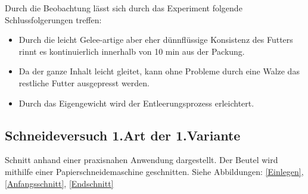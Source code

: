 Durch die Beobachtung lässt sich durch das Experiment folgende Schlussfolgerungen treffen: 
\begin{itemize}
\item Durch die leicht Gelee-artige aber eher dünnflüssige Konsistenz des Futters	rinnt es kontinuierlich innerhalb von 10 min aus der Packung.
\item Da der ganze Inhalt leicht gleitet, kann ohne Probleme durch eine Walze das restliche Futter ausgepresst werden.
\item Durch das Eigengewicht wird der Entleerungsprozess erleichtert.
\end{itemize} 

\subsection{Schneideversuch 1.Art der 1.Variante}

Schnitt anhand einer praxisnahen Anwendung dargestellt. Der Beutel wird mithilfe einer Papierschneidemaschine geschnitten. Siehe Abbildungen: \ref{Einlegen}, \ref{Anfangsschnitt}, \ref{Endschnitt}

